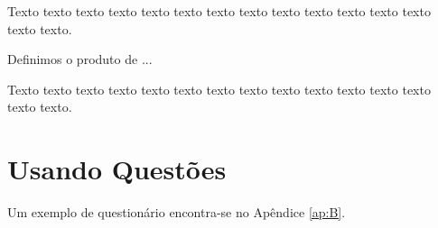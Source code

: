 Texto texto texto texto texto texto texto texto texto texto texto texto texto texto texto.


\begin{xdefinicao}
	Definimos o produto de ...
\end{xdefinicao}

Texto texto texto texto texto texto texto texto texto texto texto texto texto texto texto.

\section{Usando Questões} 

Um exemplo de questionário encontra-se no Apêndice \ref{ap:B}.


\fi